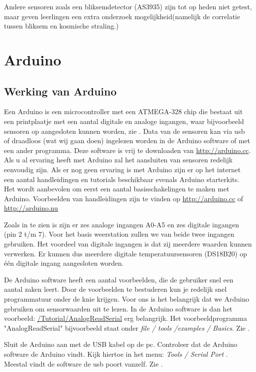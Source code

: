 Andere sensoren zoals een bliksemdetector (AS3935) zijn tot op heden
niet getest, maar geven leerlingen een extra onderzoek
mogelijkheid(namelijk de correlatie tussen bliksem en kosmische
straling.)


\section{Arduino}

\subsection{Werking van Arduino}

Een Arduino is een microcontroller met een ATMEGA-328 chip die bestaat
uit een printplaatje met een aantal digitale en analoge ingangen, waar
bijvoorbeeld sensoren op aangesloten kunnen worden, zie
. Data van de sensoren kan via usb of draadloos (wat
wij gaan doen) ingelezen worden in de Arduino software of met een ander
programma. Deze software is vrij te downloaden van
\url{http://arduino.cc}. Als u al ervaring heeft met Arduino zal het
aansluiten van sensoren redelijk eenvoudig zijn. Als er nog geen
ervaring is met Arduino zijn er op het internet een aantal handleidingen
en tutorials beschikbaar evenals Arduino starterkits. Het wordt
aanbevolen om eerst een aantal basisschakelingen te maken met Arduino.
Voorbeelden van handleidingen zijn te vinden  op \url{http://arduino.cc}
of \url{http://arduino.nu}

Zoals in  te zien is zijn er zes analoge ingangen
A0-A5 en zes digitale ingangen (pin 2 t/m 7). Voor het basis weerstation
zullen we van beide twee ingangen gebruiken. Het voordeel van digitale
ingangen is dat zij meerdere waarden kunnen verwerken. Er kunnen dus
meerdere digitale temperatuursensoren (DS18B20) op één digitale ingang
aangesloten worden.

De Arduino software heeft een aantal voorbeelden, die de gebruiker snel
een aantal zaken leert. Door de voorbeelden te bestuderen kun je
redelijk snel programmatuur onder de knie krijgen. Voor ons is het
belangrijk dat we Arduino gebruiken om sensorwaarden uit te lezen. In
de Arduino software is dan het voorbeeld:
\url{/Tutorial/AnalogReadSerial} erg belangrijk. Het voorbeeldprogramma
"AnalogReadSerial" bijvoorbeeld staat onder \emph{file / tools /examples /
Basics}. Zie .

Sluit de Arduino aan met de USB kabel op de pc. Controleer dat de
Arduino software de Arduino vindt. Kijk hiertoe in het menu: \emph{
Tools / Serial Port }. Meestal vindt de software de usb poort vanzelf.
Zie .

